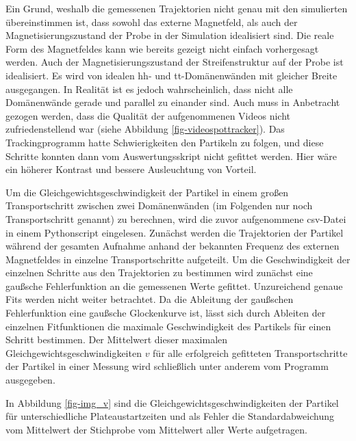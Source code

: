 \documentclass[page,pdftex,12pt,a4paper,twoside,openright]{scrbook}
\begin{document}
Ein Grund, weshalb die gemessenen Trajektorien nicht genau mit den simulierten übereinstimmen ist, dass sowohl das externe Magnetfeld, als auch der Magnetisierungszustand der Probe in der Simulation idealisiert sind. Die reale Form des Magnetfeldes kann wie bereits gezeigt nicht einfach vorhergesagt werden. Auch der Magnetisierungszustand der Streifenstruktur auf der Probe ist idealisiert. Es wird von idealen hh- und tt-Domänenwänden mit gleicher Breite ausgegangen. In Realität ist es jedoch wahrscheinlich, dass nicht alle Domänenwände gerade und parallel zu einander sind. Auch muss in Anbetracht gezogen werden, dass die Qualität der aufgenommenen Videos nicht zufriedenstellend war (siehe Abbildung \ref{fig-videospottracker}). Das Trackingprogramm hatte Schwierigkeiten den Partikeln zu folgen, und diese Schritte konnten dann vom Auswertungsskript nicht gefittet werden. Hier wäre ein höherer Kontrast und bessere Ausleuchtung von Vorteil.


Um die Gleichgewichtsgeschwindigkeit der Partikel in einem großen Transportschritt zwischen zwei Domänenwänden (im Folgenden nur noch Transportschritt genannt) zu berechnen, wird die zuvor aufgenommene csv-Datei in einem Pythonscript \cite{holzinger_pythonscript_nodate-1} eingelesen. Zunächst werden die Trajektorien der Partikel während der gesamten Aufnahme anhand der bekannten Frequenz des externen Magnetfeldes in einzelne Transportschritte aufgeteilt. Um die Geschwindigkeit der einzelnen Schritte aus den Trajektorien zu bestimmen wird zunächst eine gaußsche Fehlerfunktion an die gemessenen Werte gefittet. Unzureichend genaue Fits werden nicht weiter betrachtet. Da die Ableitung der gaußschen Fehlerfunktion eine gaußsche Glockenkurve ist, lässt sich durch Ableiten der einzelnen Fitfunktionen die maximale Geschwindigkeit des Partikels für einen Schritt bestimmen. Der Mittelwert dieser maximalen Gleichgewichtsgeschwindigkeiten \(v\) für alle erfolgreich gefitteten Transportschritte der Partikel in einer Messung wird schließlich unter anderem vom Programm ausgegeben.

In Abbildung \ref{fig-img_v} sind die Gleichgewichtsgeschwindigkeiten der Partikel für unterschiedliche Plateaustartzeiten und als Fehler die Standardabweichung vom Mittelwert der Stichprobe vom Mittelwert aller Werte aufgetragen.
\end{document}
